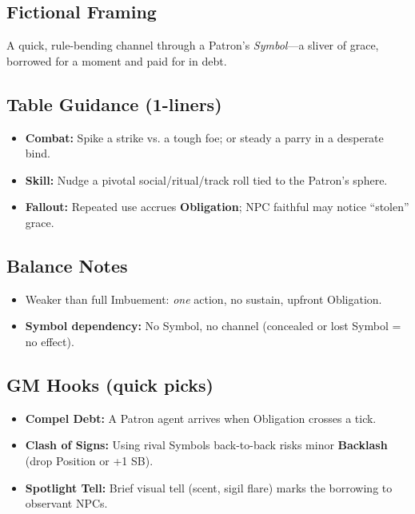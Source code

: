 \subsection*{Fictional Framing}
A quick, rule-bending channel through a Patron’s \emph{Symbol}—a sliver of grace, borrowed for a moment and paid for in debt.

\subsection*{Table Guidance (1-liners)}
\begin{itemize}
  \item \textbf{Combat:} Spike a strike vs. a tough foe; or steady a parry in a desperate bind.
  \item \textbf{Skill:} Nudge a pivotal social/ritual/track roll tied to the Patron’s sphere.
  \item \textbf{Fallout:} Repeated use accrues \textbf{Obligation}; NPC faithful may notice “stolen” grace.
\end{itemize}

\subsection*{Balance Notes}
\begin{itemize}
  \item Weaker than full Imbuement: \emph{one} action, no sustain, upfront Obligation.
  \item \textbf{Symbol dependency:} No Symbol, no channel (concealed or lost Symbol = no effect).
\end{itemize}

\subsection*{GM Hooks (quick picks)}
\begin{itemize}
  \item \textbf{Compel Debt:} A Patron agent arrives when Obligation crosses a tick.
  \item \textbf{Clash of Signs:} Using rival Symbols back-to-back risks minor \textbf{Backlash} (drop Position or +1 SB).
  \item \textbf{Spotlight Tell:} Brief visual tell (scent, sigil flare) marks the borrowing to observant NPCs.
\end{itemize}


